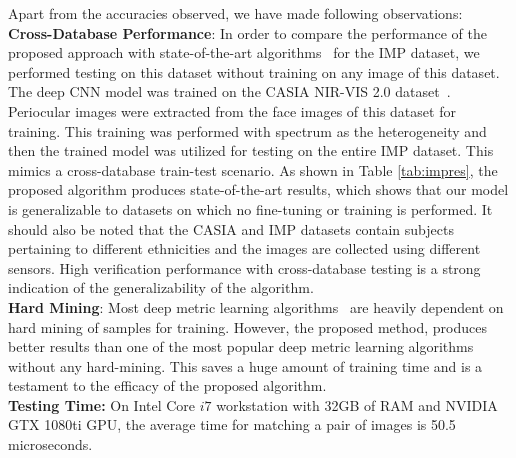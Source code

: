 \documentclass[10pt,twocolumn,letterpaper]{article}
\begin{document}
Apart from the accuracies observed, we have made following observations:\\
\textbf{Cross-Database Performance}:
In order to compare the performance of the proposed approach with state-of-the-art algorithms~\cite{behera2017periocular,ramaiah2016matching} for the IMP dataset, we performed testing on this dataset without training on any image of this dataset. The deep CNN model was trained on the CASIA NIR-VIS 2.0 dataset~\cite{li2013casia}. Periocular images were extracted from the face images of this dataset for training. This training was performed with spectrum as the heterogeneity and then the trained model was utilized for testing on the entire IMP dataset. This mimics a cross-database train-test scenario. As shown in Table \ref{tab:impres}, the proposed algorithm produces state-of-the-art results, which shows that our model is generalizable to datasets on which no fine-tuning or training is performed. It should also be noted that the CASIA and IMP datasets contain subjects pertaining to different ethnicities and the images are collected using different sensors. High verification performance with cross-database testing is a strong indication of the generalizability of the algorithm.  \\
\textbf{Hard Mining}:
Most deep metric learning algorithms~\cite{hermans2017defense,schroff2015facenet} are heavily dependent on hard mining of samples for training. However, the proposed method, produces better results than one of the most popular deep metric learning algorithms~\cite{schroff2015facenet} without any hard-mining. This saves a huge amount of training time and is a testament to the efficacy of the proposed algorithm.  \\
\textbf{Testing Time:}
On Intel Core $i7$ workstation with 32GB of RAM and NVIDIA GTX 1080ti GPU, the average time for matching a pair of images is 50.5 microseconds.  %
\vspace{-4pt}
\end{document}
